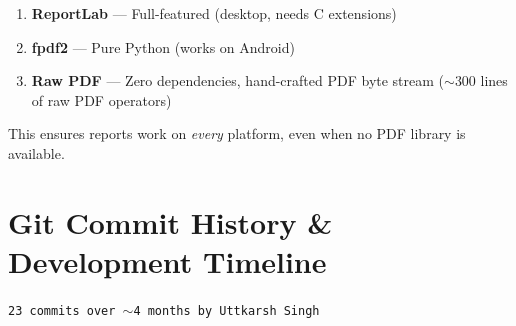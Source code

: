 \documentclass[12pt,a4paper]{article}
\begin{document}
\begin{enumerate}
    \item \textbf{ReportLab} --- Full-featured (desktop, needs C extensions)
    \item \textbf{fpdf2} --- Pure Python (works on Android)
    \item \textbf{Raw PDF} --- Zero dependencies, hand-crafted PDF byte stream ($\sim$300 lines of raw PDF operators)
\end{enumerate}

This ensures reports work on \emph{every} platform, even when no PDF library is available.

\section{Git Commit History \& Development Timeline}

\begin{quotebox}
\texttt{23 commits over $\sim$4 months by Uttkarsh Singh}
\end{quotebox}
\end{document}
